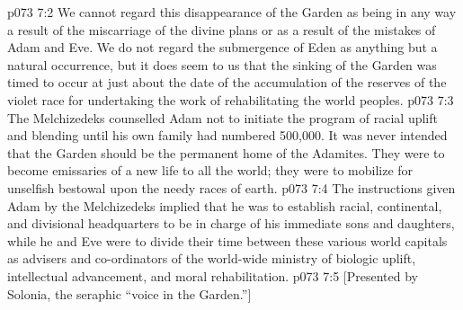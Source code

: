 \vs p073 7:2 We cannot regard this disappearance of the Garden as being in any way a result of the miscarriage of the divine plans or as a result of the mistakes of Adam and Eve. We do not regard the submergence of Eden as anything but a natural occurrence, but it does seem to us that the sinking of the Garden was timed to occur at just about the date of the accumulation of the reserves of the violet race for undertaking the work of rehabilitating the world peoples.
\vs p073 7:3 \pc The Melchizedeks counselled Adam not to initiate the program of racial uplift and blending until his own family had numbered 500,000. It was never intended that the Garden should be the permanent home of the Adamites. They were to become emissaries of a new life to all the world; they were to mobilize for unselfish bestowal upon the needy races of earth.
\vs p073 7:4 The instructions given Adam by the Melchizedeks implied that he was to establish racial, continental, and divisional headquarters to be in charge of his immediate sons and daughters, while he and Eve were to divide their time between these various world capitals as advisers and co\hyp{}ordinators of the world\hyp{}wide ministry of biologic uplift, intellectual advancement, and moral rehabilitation.
\vsetoff
\vs p073 7:5 [Presented by Solonia, the seraphic “voice in the Garden.”]
